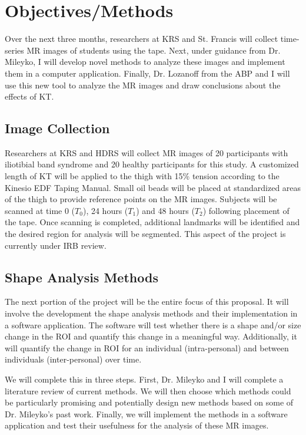 \documentclass[letterpaper, 12 pt, conference]{ieeeconf}  %
\begin{document}
\section{Objectives/Methods}

Over the next three months, researchers at \ac{KRS} and St. Francis will collect time-series MR images of students using the tape.  Next, under guidance from Dr. Mileyko, I will develop novel methods to analyze these images and implement them in a computer application.  Finally, Dr. Lozanoff from the \ac{ABP} and I will use this new tool to analyze the MR images and draw conclusions about the effects of \ac{KT}.

\subsection{Image Collection}

Researchers at \ac{KRS} and \ac{HDRS} will collect MR images of 20 participants with iliotibial band syndrome and 20 healthy participants for this study.  A customized length of \ac{KT} will be applied to the thigh with 15\% tension according to the Kinesio EDF Taping Manual. Small oil beads will be placed at standardized areas of the thigh to provide reference points on the MR images.  Subjects will be scanned at time 0 ($T_0$), 24 hours ($T_1$) and 48 hours ($T_2$) following placement of the tape. Once scanning is completed, additional landmarks will be identified and the desired region for analysis will be segmented. This aspect of the project is currently under IRB review.

\subsection{Shape Analysis Methods}

The next portion of the project will be the entire focus of this proposal.  It will involve the development the shape analysis methods and their implementation in a software application.   The software will test whether there is a shape and/or size change in the \ac{ROI} and quantify this change in a meaningful way.  Additionally, it will quantify the change in \ac{ROI} for an individual (intra-personal) and between individuals (inter-personal) over time.  

We will complete this in three steps.  First, Dr. Mileyko and I will complete a literature review of current methods.  We will then choose which methods could be particularly promising and potentially design new methods based on some of Dr. Mileyko's past work.  Finally, we will implement the methods in a software application and test their usefulness for the analysis of these MR images. 
\end{document}
